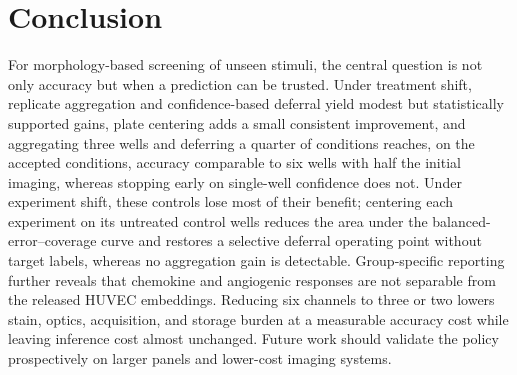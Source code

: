 \documentclass[conference]{IEEEtran}
\begin{document}
\section{Conclusion}
For morphology-based screening of unseen stimuli, the central question is not only accuracy but when a prediction can be trusted. Under treatment shift, replicate aggregation and confidence-based deferral yield modest but statistically supported gains, plate centering adds a small consistent improvement, and aggregating three wells and deferring a quarter of conditions reaches, on the accepted conditions, accuracy comparable to six wells with half the initial imaging, whereas stopping early on single-well confidence does not. Under experiment shift, these controls lose most of their benefit; centering each experiment on its untreated control wells reduces the area under the balanced-error--coverage curve and restores a selective deferral operating point without target labels, whereas no aggregation gain is detectable. Group-specific reporting further reveals that chemokine and angiogenic responses are not separable from the released HUVEC embeddings. Reducing six channels to three or two lowers stain, optics, acquisition, and storage burden at a measurable accuracy cost while leaving inference cost almost unchanged. Future work should validate the policy prospectively on larger panels and lower-cost imaging systems.



\end{document}
